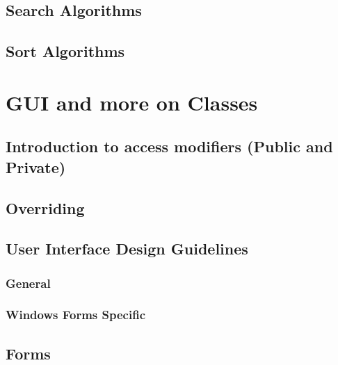 \documentclass[
]{book}
\begin{document}
\hypertarget{search-algorithms}{%
\section{Search Algorithms}\label{search-algorithms}}

\hypertarget{sort-algorithms}{%
\section{Sort Algorithms}\label{sort-algorithms}}

\hypertarget{gui-and-more-on-classes}{%
\chapter{GUI and more on Classes}\label{gui-and-more-on-classes}}

\hypertarget{introduction-to-access-modifiers-public-and-private}{%
\section{Introduction to access modifiers (Public and Private)}\label{introduction-to-access-modifiers-public-and-private}}

\hypertarget{overriding}{%
\section{Overriding}\label{overriding}}

\hypertarget{user-interface-design-guidelines}{%
\section{User Interface Design Guidelines}\label{user-interface-design-guidelines}}

\hypertarget{general}{%
\subsection{General}\label{general}}

\hypertarget{windows-forms-specific}{%
\subsection{Windows Forms Specific}\label{windows-forms-specific}}

\hypertarget{forms}{%
\section{Forms}\label{forms}}
\end{document}
